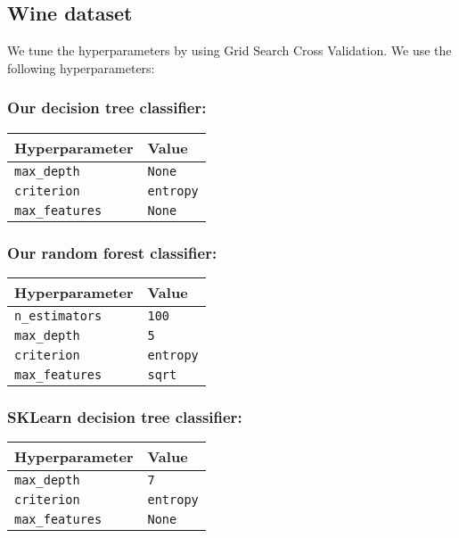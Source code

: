 \documentclass[11pt]{article}
\begin{document}
    \subsection{Wine dataset}\label{wine-dataset}

We tune the hyperparameters by using Grid Search Cross Validation. We
use the following hyperparameters:

\subsubsection{Our decision tree
classifier:}\label{our-decision-tree-classifier}

\begin{longtable}[]{@{}ll@{}}
\toprule\noalign{}
Hyperparameter & Value \\
\midrule\noalign{}
\endhead
\bottomrule\noalign{}
\endlastfoot
\texttt{max\_depth} & \texttt{None} \\
\texttt{criterion} & \texttt{entropy} \\
\texttt{max\_features} & \texttt{None} \\
\end{longtable}

\subsubsection{Our random forest
classifier:}\label{our-random-forest-classifier}

\begin{longtable}[]{@{}ll@{}}
\toprule\noalign{}
Hyperparameter & Value \\
\midrule\noalign{}
\endhead
\bottomrule\noalign{}
\endlastfoot
\texttt{n\_estimators} & \texttt{100} \\
\texttt{max\_depth} & \texttt{5} \\
\texttt{criterion} & \texttt{entropy} \\
\texttt{max\_features} & \texttt{sqrt} \\
\end{longtable}

\subsubsection{SKLearn decision tree
classifier:}\label{sklearn-decision-tree-classifier}

\begin{longtable}[]{@{}ll@{}}
\toprule\noalign{}
Hyperparameter & Value \\
\midrule\noalign{}
\endhead
\bottomrule\noalign{}
\endlastfoot
\texttt{max\_depth} & \texttt{7} \\
\texttt{criterion} & \texttt{entropy} \\
\texttt{max\_features} & \texttt{None} \\
\end{longtable}
\end{document}
